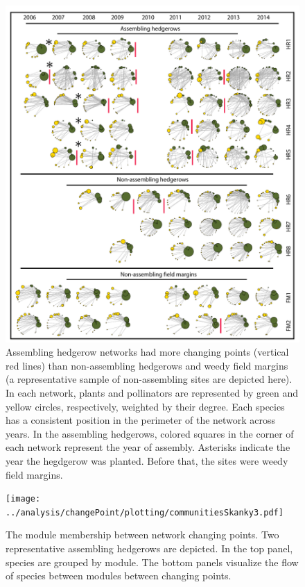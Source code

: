 \documentclass[12pt]{article}
\begin{document}





\begin{figure}
  \centering
  \includegraphics[width=1\textwidth]{../analysis/changePoint/plotting/networksv1.pdf}
  \caption{Assembling hedgerow networks had more changing points
    (vertical red lines) than non-assembling hedgerows and weedy field
    margins (a representative sample of non-assembling sites are
    depicted here). In each network, plants and pollinators are
    represented by green and yellow circles, respectively, weighted by
    their degree. Each species has a consistent position in the
    perimeter of the network across years. In the assembling
    hedgerows, colored squares in the corner of each network represent
    the year of assembly. Asterisks indicate the year the hegdgerow
    was planted. Before that, the sites were weedy field margins.}
  \label{fig:changePoints}
\end{figure}
\clearpage

\begin{figure}
  \centering
  \texttt{[image: ../analysis/changePoint/plotting/communitiesSkanky3.pdf]}
  \caption{The module membership between network changing points. Two
    representative assembling hedgerows are depicted. In the top
    panel, species are grouped by module. The bottom panels visualize
    the flow of species between modules between changing points. }
  \label{fig:changePoints2}
\end{figure}
\clearpage
\end{document}

